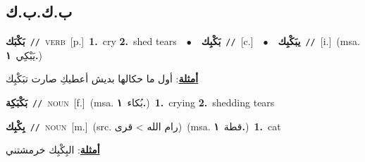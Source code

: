 \documentclass[10pt,a4paper,twoside]{article} %
\begin{document}
\begin{multicols}{2}
\vspace{-3mm}
\subsection*{\color{blue}\foreignlanguage{arabic}{ب.ك.ب.ك}\color{blue}{}} 

{\setlength\topsep{0pt}\textbf{\foreignlanguage{arabic}{بَكْبَك}}\ {\color{gray}\texttt{//}\color{black}}\ \textsc{verb}\ [p.]\ \textbf{1.}~cry  \textbf{2.}~shed tears\ \ $\bullet$\ \ \setlength\topsep{0pt}\textbf{\foreignlanguage{arabic}{بَكْبِك}}\ {\color{gray}\texttt{//}\color{black}}\ [c.]\ \ $\bullet$\ \ \setlength\topsep{0pt}\textbf{\foreignlanguage{arabic}{يبَكْبِك}}\ {\color{gray}\texttt{//}\color{black}}\ [i.]\ \color{gray}(msa. \foreignlanguage{arabic}{يَبْكِي}~\foreignlanguage{arabic}{\textbf{١.}})\color{black}\  \begin{flushright}\color{gray}\foreignlanguage{arabic}{\textbf{\underline{\foreignlanguage{arabic}{أمثلة}}}: أول ما حكالها بديش أعطيكِ صارت تبَكْبِك}\end{flushright}\color{black}} \vspace{2mm}

{\setlength\topsep{0pt}\textbf{\foreignlanguage{arabic}{بَكْبَكِة}}\ {\color{gray}\texttt{//}\color{black}}\ \textsc{noun}\ [f.]\ \color{gray}(msa. \foreignlanguage{arabic}{بُكاء}~\foreignlanguage{arabic}{\textbf{١.}})\color{black}\ \textbf{1.}~crying  \textbf{2.}~shedding tears\ } \vspace{2mm}

{\setlength\topsep{0pt}\textbf{\foreignlanguage{arabic}{بِكْبِك}}\ {\color{gray}\texttt{//}\color{black}}\ \textsc{noun}\ [m.]\ (src. \color{gray}\foreignlanguage{arabic}{رام الله > قرى}\color{black})\ \color{gray}(msa. \foreignlanguage{arabic}{قطة}~\foreignlanguage{arabic}{\textbf{١.}})\color{black}\ \textbf{1.}~cat\  \begin{flushright}\color{gray}\foreignlanguage{arabic}{\textbf{\underline{\foreignlanguage{arabic}{أمثلة}}}: البِكْبِك خرمشتني}\end{flushright}\color{black}} \vspace{2mm}


\end{multicols}
\end{document}

